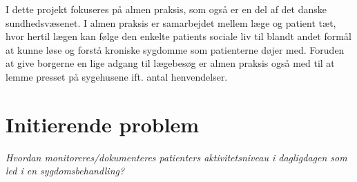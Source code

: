 I dette projekt fokuseres på almen praksis, som også er en del af det danske sundhedsvæsenet. I almen praksis er samarbejdet mellem læge og patient tæt, hvor hertil lægen kan følge den enkelte patients sociale liv til blandt andet formål at kunne løse og forstå kroniske sygdomme som patienterne døjer med. 
Foruden at give borgerne en lige adgang til lægebesøg er almen praksis også med til at lemme presset på sygehusene ift. antal henvendelser. \citep{1}







\section{Initierende problem}
\textit{Hvordan monitoreres/dokumenteres patienters aktivitetsniveau i dagligdagen som led i en sygdomsbehandling?}  
